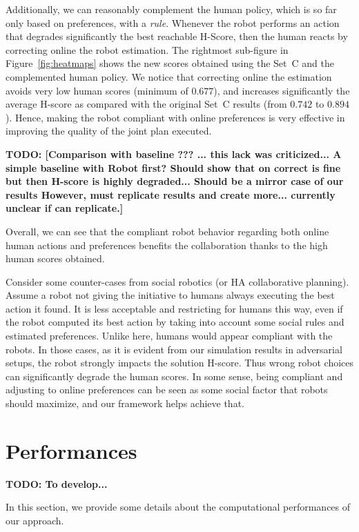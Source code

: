 Additionally, we can reasonably complement the human policy, which is so far only based on preferences, with a \textit{rule}. Whenever the robot performs an action that degrades significantly the best reachable H-Score, then the human reacts by correcting online the robot estimation.
The rightmost sub-figure in Figure~\ref{fig:heatmaps} shows the new scores obtained using the Set~C and the complemented human policy. 
We notice that correcting online the estimation avoids very low human scores (minimum of $0.677$), and increases significantly the average H-score as compared with the original Set~C results (from $0.742$ to $0.894$). Hence, making the robot compliant with online preferences is very effective in improving the quality of the joint plan executed.

\textbf{TODO: [Comparison with baseline ??? ... this lack was criticized... A simple baseline with Robot first? Should show that on correct is fine but then H-score is highly degraded... Should be a mirror case of our results However, must replicate results and create more... currently unclear if can replicate.]}

Overall, we can see that the compliant robot behavior regarding both online human actions and preferences benefits the collaboration thanks to the high human scores obtained.

Consider some counter-cases from social robotics (or HA collaborative planning). Assume a robot not giving the initiative to humans always executing the best action it found. 
It is less acceptable and restricting for humans this way, even if the robot computed its best action by taking into account some social rules and estimated preferences. 
Unlike here, humans would appear compliant with the robots. 
In those cases, as it is evident from our simulation results in adversarial setups, the robot strongly impacts the solution H-score. Thus wrong robot choices can significantly degrade the human scores. In some sense, being compliant and adjusting to online preferences can be seen as some social factor that robots should maximize, and our framework helps achieve that.

\section{Performances}

\textbf{TODO: To develop...}

In this section, we provide some details about the computational performances of our approach. 

